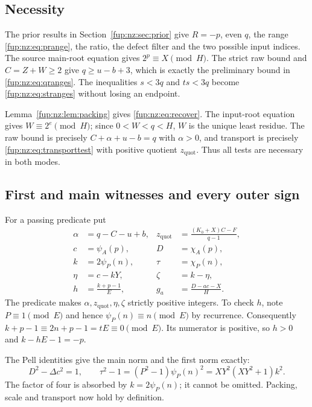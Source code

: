 \documentclass[11pt,letterpaper]{article}
\theoremstyle{definition}\newtheorem{definition}[theorem]{Definition}
\theoremstyle{remark}\newtheorem{remark}[theorem]{Remark}
\newcommand{\zquot}{z_{\mathrm{quot}}}\newcommand{\ga}{g_a}
\begin{document}
\subsection{Necessity}
The prior results in Section~\ref{fup:nz:sec:prior} give $R=-p$, even $q$, the range \eqref{fup:nz:eq:prange}, the ratio, the defect filter and the two possible input indices. The source main-root equation gives $2^p\equiv X\pmod H$. The strict raw bound and $C=Z+W\ge2$ give $q\ge u-b+3$, which is exactly the preliminary bound in \eqref{fup:nz:eq:qranges}. The inequalities $s<3q$ and $ts<3q$ become \eqref{fup:nz:eq:stranges} without losing an endpoint.

Lemma~\ref{fup:nz:lem:packing} gives \eqref{fup:nz:eq:recover}. The input-root equation gives $W\equiv2^e\pmod H$; since $0<W<q<H$, $W$ is the unique least residue. The raw bound is precisely $C+\alpha+u-b=q$ with $\alpha>0$, and transport is precisely \eqref{fup:nz:eq:transporttest} with positive quotient $\zquot$. Thus all tests are necessary in both modes.

\subsection{First and main witnesses and every outer sign}
For a passing predicate put
\begin{align}\label{fup:nz:eq:mainwitness}
 \alpha&=q-C-u+b,&\zquot&=\frac{(K_0+X)C-F}{q-1},\\
 c&=\psi_A(p),&D&=\chi_A(p),\\
 k&=2\psi_P(n),&\tau&=\chi_P(n),\\
 \eta&=c-kY,&\zeta&=k-\eta,\\
 h&=\frac{k+p-1}{E},&\ga&=\frac{D-ac-X}{H}.\nonumber
\end{align}
The predicate makes $\alpha,\zquot,\eta,\zeta$ strictly positive integers. To check $h$, note $P\equiv1\pmod E$ and hence $\psi_P(n)\equiv n\pmod E$ by recurrence. Consequently $k+p-1\equiv2n+p-1=tE\equiv0\pmod E$. Its numerator is positive, so $h>0$ and $k-hE-1=-p$.

The Pell identities give the main norm and the first norm exactly:
\[
 D^2-\Delta c^2=1,\qquad
 \tau^2-1=(P^2-1)\psi_P(n)^2=XY^2(XY^2+1)k^2.
\]
The factor of four is absorbed by $k=2\psi_P(n)$; it cannot be omitted. Packing, scale and transport now hold by definition.
\end{document}
